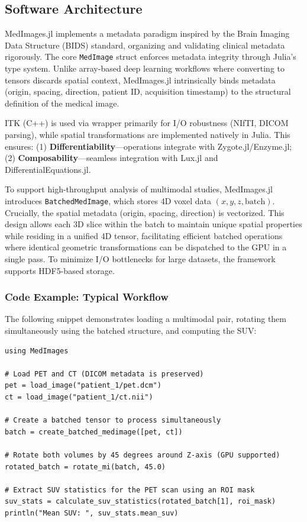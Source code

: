 \documentclass[10pt,letterpaper]{article}
\begin{document}
\subsection*{Software Architecture}
MedImages.jl implements a metadata paradigm inspired by the Brain Imaging Data Structure (BIDS) standard, organizing and validating clinical metadata rigorously. The core \texttt{MedImage} struct enforces metadata integrity through Julia's type system. Unlike array-based deep learning workflows where converting to tensors discards spatial context, MedImages.jl intrinsically binds metadata (origin, spacing, direction, patient ID, acquisition timestamp) to the structural definition of the medical image.

ITK (C++) is used via wrapper primarily for I/O robustness (NIfTI, DICOM parsing), while spatial transformations are implemented natively in Julia. This ensures: (1) \textbf{Differentiability}—operations integrate with Zygote.jl/Enzyme.jl; (2) \textbf{Composability}—seamless integration with Lux.jl and DifferentialEquations.jl.

To support high-throughput analysis of multimodal studies, MedImages.jl introduces \texttt{BatchedMedImage}, which stores 4D voxel data $(x, y, z, \text{batch})$. Crucially, the spatial metadata (origin, spacing, direction) is vectorized. This design allows each 3D slice within the batch to maintain unique spatial properties while residing in a unified 4D tensor, facilitating efficient batched operations where identical geometric transformations can be dispatched to the GPU in a single pass. To minimize I/O bottlenecks for large datasets, the framework supports HDF5-based storage.

\subsubsection*{Code Example: Typical Workflow}
The following snippet demonstrates loading a multimodal pair, rotating them simultaneously using the batched structure, and computing the SUV:

\begin{lstlisting}[basicstyle=\ttfamily\footnotesize]
using MedImages

# Load PET and CT (DICOM metadata is preserved)
pet = load_image("patient_1/pet.dcm")
ct = load_image("patient_1/ct.nii")

# Create a batched tensor to process simultaneously
batch = create_batched_medimage([pet, ct])

# Rotate both volumes by 45 degrees around Z-axis (GPU supported)
rotated_batch = rotate_mi(batch, 45.0)

# Extract SUV statistics for the PET scan using an ROI mask
suv_stats = calculate_suv_statistics(rotated_batch[1], roi_mask)
println("Mean SUV: ", suv_stats.mean_suv)
\end{lstlisting}
\end{document}
